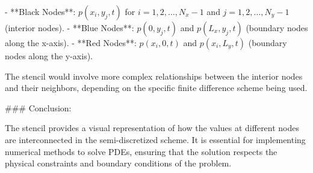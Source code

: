 - **Black Nodes**: \( p(x_i, y_j, t) \) for \( i = 1, 2, \ldots, N_x-1 \) and \( j = 1, 2, \ldots, N_y-1 \) (interior nodes).
- **Blue Nodes**: \( p(0, y_j, t) \) and \( p(L_x, y_j, t) \) (boundary nodes along the x-axis).
- **Red Nodes**: \( p(x_i, 0, t) \) and \( p(x_i, L_y, t) \) (boundary nodes along the y-axis).

The stencil would involve more complex relationships between the interior nodes and their neighbors, depending on the specific finite difference scheme being used.

### Conclusion:

The stencil provides a visual representation of how the values at different nodes are interconnected in the semi-discretized scheme. It is essential for implementing numerical methods to solve PDEs, ensuring that the solution respects the physical constraints and boundary conditions of the problem.